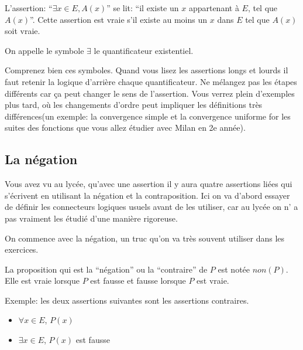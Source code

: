 \documentclass{article}
\begin{document}
\begin{tcolorbox}[colback=red!5!white,colframe=red!75!black,title=Définition 1.5]

L'assertion: ``$\exists x \in E, A(x)$'' se lit: ``il existe un $x$ appartenant à $E$, tel que $A(x)$''. Cette assertion est vraie s'il existe au moins un $x$ dans $E$ tel que $A(x)$ soit vraie.

\tcblower

On appelle le symbole $\exists$ le quantificateur existentiel.

\end{tcolorbox}

Comprenez bien ces symboles. Quand vous lisez les assertions longs et lourds il faut retenir la logique d'arrière chaque quantificateur. Ne mélangez pas les étapes différents car \c ca peut changer le sens de l'assertion. Vous verrez plein d'exemples plus tard, où les changements d'ordre peut impliquer les définitions très différences(un exemple: la convergence simple et la convergence uniforme for les suites des fonctions que vous allez étudier avec Milan en 2e année).

\subsection{La négation}

Vous avez vu au lycée, qu'avec une assertion il y aura quatre assertions liées qui s'écrivent en utilisant la négation et la contraposition. Ici on va d'abord essayer de définir les connecteurs logiques usuels avant de les utiliser, car au lycée on n' a pas vraiment les étudié d'une manière rigoreuse.

On commence avec la négation, un truc qu'on va très souvent utiliser dans les exercices.

\begin{tcolorbox}[colback=red!5!white,colframe=red!75!black,title=Définition 1.6]

La proposition qui est la ``négation'' ou la ``contraire'' de $P$ est notée $non(P)$. Elle est vraie lorsque $P$ est fausse et fausse lorsque $P$ est vraie.

\end{tcolorbox}

Exemple: les deux assertions suivantes sont les assertions contraires.
\begin{itemize}
 \item $\forall x \in E$, $P(x)$
 \item $\exists x \in E$, $P(x)$ est fausse
\end{itemize}
\end{document}
